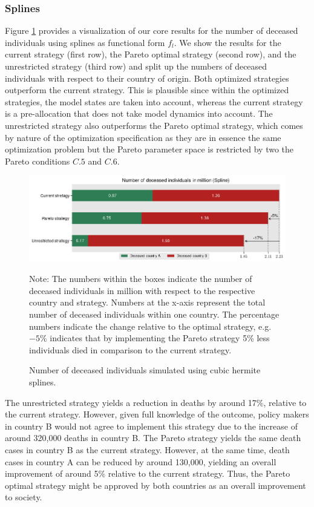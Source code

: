 \subsubsection*{Splines}
Figure \ref{fig:results_splines_numbers} provides a visualization of our core results for the number of deceased individuals using splines as functional form $f_l$. We show the results for the current strategy (first row), the Pareto optimal strategy (second row), and the unrestricted strategy (third row) and split up the numbers of deceased individuals with respect to their country of origin. Both optimized strategies outperform the current strategy. This is plausible since within the optimized strategies, the model states are taken into account, whereas the current strategy is a pre-allocation that does not take model dynamics into account. The unrestricted strategy also outperforms the Pareto optimal strategy, which comes by nature of the optimization specification as they are in essence the same optimization problem but the Pareto parameter space is restricted by two the Pareto conditions $C.5$ and $C.6$. 
\begin{figure}[h!]
\centering
\includegraphics[scale=0.75]{images/splines_percentage_deviation.png}\\
\begin{flushleft}
\scriptsize{Note: The numbers within the boxes indicate the number of deceased individuals in million with respect to the respective country and strategy. Numbers at the x-axis represent the total number of deceased individuals within one country. The percentage numbers indicate the change relative to the optimal strategy, e.g. $-5\%$ indicates that by implementing the Pareto strategy 5\% less individuals died in comparison to the current strategy.}
\end{flushleft}
\caption{Number of deceased individuals simulated using cubic hermite splines.}
\label{fig:results_splines_numbers}
\end{figure}

The unrestricted strategy yields a reduction in deaths by around 17\%, relative to the current strategy. However, given full knowledge of the outcome, policy makers in country B would not agree to implement this strategy due to the increase of around 320,000 deaths in country B. The Pareto strategy yields the same death cases in country B as the current strategy. However, at the same time, death cases in country A can be reduced by around 130,000, yielding an overall improvement of around 5\% relative to the current strategy. Thus, the Pareto optimal strategy might be approved by both countries as an overall improvement to society. \\

